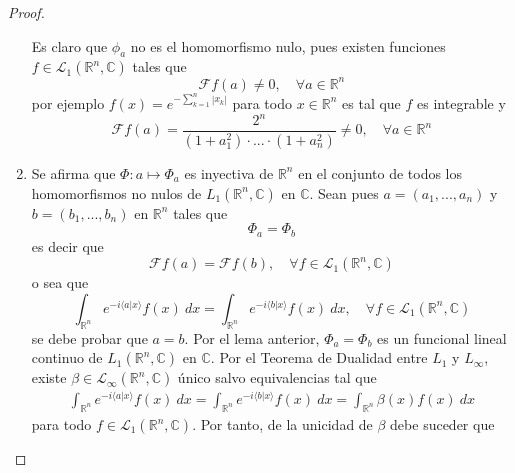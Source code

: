 \documentclass[12pt]{report}
\newcounter{it}
\theoremstyle{largebreak}
\newcommand\abs[1]{\ensuremath{\left|#1\right|}}
\newcommand\pint[2]{\ensuremath{\langle#1| #2\rangle}}
\newcommand{\fou}[1]{\ensuremath{\mathcal{F}#1}}
\begin{document}
\begin{proof}
\begin{enumerate}
            Es claro que $\phi_a$ no es el homomorfismo nulo, pues existen funciones $f\in\mathcal{L}_1(\mathbb{R}^n,\mathbb{C})$ tales que
            \begin{equation*}
                \fou{f}(a)\neq0,\quad\forall a\in\mathbb{R}^n
            \end{equation*}
            por ejemplo $f(x)=e^{ -\sum_{ k=1}^n \abs{x_k}}$ para todo $x\in\mathbb{R}^n$ es tal que $f$ es integrable y
            \begin{equation*}
                \fou{f}(a)=\frac{2^n}{(1+a_1^2)\cdot...\cdot(1+a_n^2)}\neq0,\quad\forall a\in\mathbb{R}^n
            \end{equation*}
            \item Se afirma que $\Phi:a\mapsto\Phi_a$ es inyectiva de $\mathbb{R}^n$ en el conjunto de todos los homomorfismos no nulos de $L_1(\mathbb{R}^n,\mathbb{C})$ en $\mathbb{C}$. Sean pues $a=(a_1,...,a_n)$ y $b=(b_1,...,b_n)$ en $\mathbb{R}^n$ tales que
            \begin{equation*}
                \Phi_a=\Phi_b
            \end{equation*}
            es decir que
            \begin{equation*}
                \fou{f}(a)=\fou{f}(b),\quad\forall f\in\mathcal{L}_1(\mathbb{R}^n,\mathbb{C})
            \end{equation*}
            o sea que
            \begin{equation*}
                \int_{\mathbb{R}^n}e^{ -i\pint{a}{x}}f(x)\:dx=\int_{\mathbb{R}^n}e^{ -i\pint{b}{x}}f(x)\:dx,\quad\forall f\in\mathcal{L}_1(\mathbb{R}^n,\mathbb{C})
            \end{equation*}
            se debe probar que $a=b$. Por el lema anterior, $\Phi_a=\Phi_b$ es un funcional lineal continuo de $L_1(\mathbb{R}^n,\mathbb{C})$ en $\mathbb{C}$. Por el Teorema de Dualidad entre $L_1$ y $L_\infty$, existe $\beta\in\mathcal{L}_{\infty}(\mathbb{R}^n,\mathbb{C})$ único salvo equivalencias tal que
            \begin{equation*}
                \begin{split}
                    \int_{\mathbb{R}^n}e^{ -i\pint{a}{x}}f(x)\:dx=\int_{\mathbb{R}^n}e^{ -i\pint{b}{x}}f(x)\:dx=\int_{\mathbb{R}^n}\beta(x)f(x)\:dx
                \end{split}
            \end{equation*}
            para todo $f\in\mathcal{L}_1(\mathbb{R}^n,\mathbb{C})$. Por tanto, de la unicidad de $\beta$ debe suceder que

\end{enumerate}
\end{proof}
\end{document}

